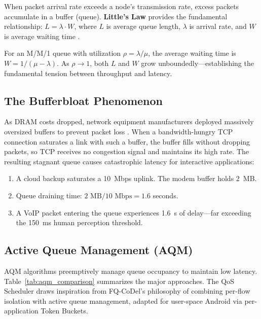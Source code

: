 When packet arrival rate exceeds a node's transmission rate, excess packets accumulate in a buffer (queue). \textbf{Little's Law} provides the fundamental relationship: $L = \lambda \cdot W$, where $L$ is average queue length, $\lambda$ is arrival rate, and $W$ is average waiting time \cite{stallings_2014}.

For an M/M/1 queue with utilization $\rho = \lambda / \mu$, the average waiting time is $W = 1/(\mu - \lambda)$. As $\rho \rightarrow 1$, both $L$ and $W$ grow unboundedly---establishing the fundamental tension between throughput and latency.

\subsection{The Bufferbloat Phenomenon}

As DRAM costs dropped, network equipment manufacturers deployed massively oversized buffers to prevent packet loss \cite{gettys_2012}. When a bandwidth-hungry TCP connection saturates a link with such a buffer, the buffer fills without dropping packets, so TCP receives no congestion signal and maintains its high rate. The resulting stagnant queue causes catastrophic latency for interactive applications:

\begin{enumerate}[noitemsep]
    \item A cloud backup saturates a 10~Mbps uplink. The modem buffer holds 2~MB.
    \item Queue draining time: $2 \text{ MB} / 10 \text{ Mbps} = 1.6$ seconds.
    \item A VoIP packet entering the queue experiences 1.6~s of delay---far exceeding the 150~ms human perception threshold.
\end{enumerate}

\subsection{Active Queue Management (AQM)}
\label{subsec:aqm}

AQM algorithms preemptively manage queue occupancy to maintain low latency. Table~\ref{tab:aqm_comparison} summarizes the major approaches. The QoS Scheduler draws inspiration from FQ-CoDel's philosophy of combining per-flow isolation with active queue management, adapted for user-space Android via per-application Token Buckets.

